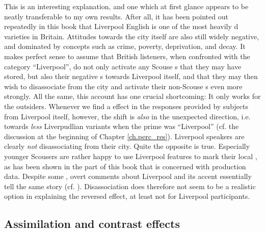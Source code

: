 This is an interesting explanation, and one which at first glance appears to be neatly transferable to my own results.
After all, it has been pointed out repeatedly in this book that Liverpool English is one of the most heavily d varieties in Britain.
Attitudes towards the city itself are also still widely negative, and dominated by concepts such as crime, poverty, deprivation, and decay.
It makes perfect sense to assume that British listeners, when confronted with the category ``Liverpool'', do not only activate any Scouse s that they may have stored, but also their negative s towards Liverpool itself, and that they may then wish to disassociate from the city and activate their non-Scouse s even more strongly.
All the same, this account has one crucial shortcoming: It only works for the outsiders.
Whenever we find a  effect in the responses provided by subjects from Liverpool itself, however, the shift is \emph{also} in the unexpected direction, i.e. towards \emph{less} Liverpudlian variants when the prime was ``Liverpool'' (cf. the discussion at the beginning of Chapter \ref{ch.perc_res}).
Liverpool speakers are clearly \emph{not} disassociating from their city.
Quite the opposite is true.
Especially younger Scousers are rather happy to use Liverpool features to mark their local , as has been shown in the part of this book that is concerned with production data.
Despite some , overt comments about Liverpool and its accent essentially tell the same story (cf. ).
Disassociation does therefore not seem to be a realistic option in explaining the reversed  effect, at least not for Liverpool participants.

		\subsection{Assimilation and contrast effects}

